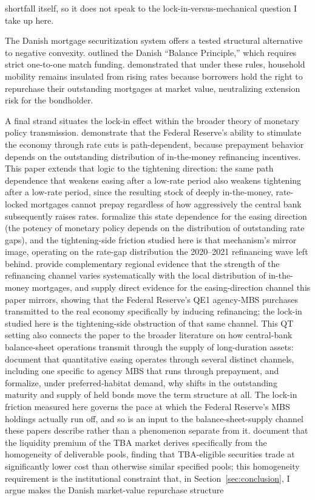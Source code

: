 \documentclass[12pt]{article}
\begin{document}
shortfall itself, so it does not speak to the lock-in-versus-mechanical question I take up here.

The Danish mortgage securitization system offers a tested structural alternative to negative convexity. \citet{berg2018} outlined the Danish ``Balance Principle,'' which requires strict one-to-one match funding. \citet{berger2026} demonstrated that under these rules, household mobility remains insulated from rising rates because borrowers hold the right to repurchase their outstanding mortgages at market value, neutralizing extension risk for the bondholder.

A final strand situates the lock-in effect within the broader theory of monetary policy transmission. \citet{berger2021} demonstrate that the Federal Reserve's ability to stimulate the economy through rate cuts is path-dependent, because prepayment behavior depends on the outstanding distribution of in-the-money refinancing incentives. This paper extends that logic to the tightening direction: the same path dependence that weakens easing after a low-rate period also weakens tightening after a low-rate period, since the resulting stock of deeply in-the-money, rate-locked mortgages cannot prepay regardless of how aggressively the central bank subsequently raises rates. \citet{eichenbaum2022} formalize this state dependence for the easing direction (the potency of monetary policy depends on the distribution of outstanding rate gaps), and the tightening-side friction studied here is that mechanism's mirror image, operating on the rate-gap distribution the 2020--2021 refinancing wave left behind. \citet{beraja2019} provide complementary regional evidence that the strength of the refinancing channel varies systematically with the local distribution of in-the-money mortgages, and \citet{dimaggio2020} supply direct evidence for the easing-direction channel this paper mirrors, showing that the Federal Reserve's QE1 agency-MBS purchases transmitted to the real economy specifically by inducing refinancing; the lock-in studied here is the tightening-side obstruction of that same channel. This QT setting also connects the paper to the broader literature on how central-bank balance-sheet operations transmit through the supply of long-duration assets: \citet{krishnamurthy2011} document that quantitative easing operates through several distinct channels, including one specific to agency MBS that runs through prepayment, and \citet{vayanos2021} formalize, under preferred-habitat demand, why shifts in the outstanding maturity and supply of held bonds move the term structure at all. The lock-in friction measured here governs the pace at which the Federal Reserve's MBS holdings actually run off, and so is an input to the balance-sheet-supply channel these papers describe rather than a phenomenon separate from it. \citet{vickery2013} document that the liquidity premium of the TBA market derives specifically from the homogeneity of deliverable pools, finding that TBA-eligible securities trade at significantly lower cost than otherwise similar specified pools; this homogeneity requirement is the institutional constraint that, in Section~\ref{sec:conclusion}, I argue makes the Danish market-value repurchase structure 
\end{document}
